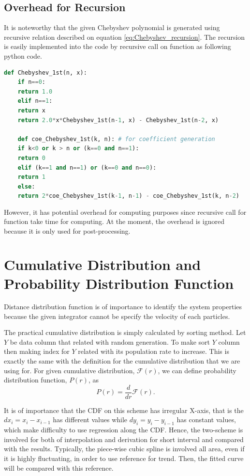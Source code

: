 \message{ !name(brief_Brownian_dynamics.tex)}\documentclass[10pt, a4paper]{report}
\begin{document}
\begin{appendices}
  \section{Overhead for Recursion}
  It is noteworthy that the given Chebyshev polynomial is generated using recursive relation described on equation \eqref{eq:Chebyshev_recursion}. The recursion is easily implemented into the code by recursive call on function as following python code.

  \begin{lstlisting}[language=Python, frame=single]
    def Chebyshev_1st(n, x): 
    if n==0:
    return 1.0
    elif n==1:
    return x
    return 2.0*x*Chebyshev_1st(n-1, x) - Chebyshev_1st(n-2, x)

    def coe_Chebyshev_1st(k, n): # for coefficient generation
    if k<0 or k > n or (k==0 and n==1):
    return 0
    elif (k==1 and n==1) or (k==0 and n==0):
    return 1
    else:
    return 2*coe_Chebyshev_1st(k-1, n-1) - coe_Chebyshev_1st(k, n-2)
  \end{lstlisting}

  However, it has potential overhead for computing purposes since recursive call for function take time for computing. At the moment, the overhead is ignored because it is only used for post-processing. 


  \chapter{Cumulative Distribution and Probability Distribution Function}\label{appen_distance_distribution}
  Distance distribution function is of importance to identify the system properties because the given integrator cannot be specify the velocity of each particles. 

  The practical cumulative distribution is simply calculated by sorting method. Let $Y$ be data column that related with random generation. To make sort $Y$ column then making index for $Y$ related with its population rate to increase. This is exactly the same with the definition for the cumulative distribution that we are using for. For given cumulative distribution, $\mathscr{F}(r)$, we can define probability distribution function, $P(r)$, as
  \begin{equation}
    P(r) = \frac{d}{dr}\mathscr{F}(r).
  \end{equation}

  It is of importance that the CDF on this scheme has irregular X-axis, that is the $dx_i = x_i - x_{i-1}$ has different values while $dy_i = y_i - y_{i-1}$ has constant values, which make difficulty to use regression along the CDF. Hence, the two-scheme is involved for both of interpolation and derivation for short interval and compared with the results. Typically, the piece-wise cubic spline is involved all area, even if it is highly fluctuating, in order to use reference for trend. Then, the fitted curve will be compared with this reference.



\end{appendices}
\end{document}
